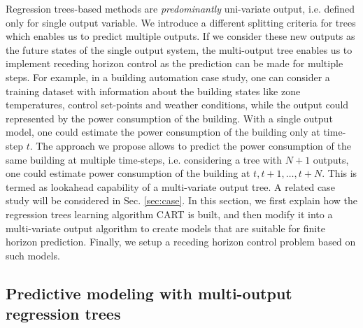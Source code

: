 \textcolor[rgb]{1.00,0.00,0.00}{Regression trees-based methods are \emph{predominantly} uni-variate output, i.e. defined only for single output variable. We introduce a different splitting criteria for trees which enables us to predict multiple outputs. If we consider these new outputs as the future states of the single output system, the multi-output tree enables us to implement receding horizon control as the prediction can be made for multiple steps. For example, in a building automation case study, one can consider a training dataset with information about the building states like zone temperatures, control set-points and weather conditions, while the output could represented by the power consumption of the building. With a single output model, one could estimate the power consumption of the building only at time-step $t$. The approach we propose allows to predict the power consumption of the same building at multiple time-steps, i.e. considering a tree with $N+1$ outputs, one could estimate power consumption of the building at $t, t+1,\ldots,t+N$. This is termed as lookahead capability of a multi-variate output tree. A related case study will be considered in Sec. \ref{sec:case}. In this section, we first explain how the regression trees learning algorithm CART is built, and then modify it into a multi-variate output algorithm to create models that are suitable for finite horizon prediction. Finally, we setup a receding horizon control problem based on such models.}

\subsection{Predictive modeling with multi-output regression trees}
\label{SS:training_algo}

